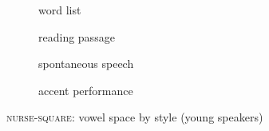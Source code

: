 \begin{figure}[b]
	
	\begin{subfigure}{.49\textwidth}
		
			\resizebox{\linewidth}{!}{} 
		\caption{word list}
		\label{fig.nurse.space.young.list}
	\end{subfigure}
	\begin{subfigure}{.49\textwidth}
		
			\resizebox{\linewidth}{!}{} 
		\caption{reading passage}
		\label{fig.nurse.space.young.read}
	\end{subfigure}
	
	\begin{subfigure}{.49\textwidth}
		
			\resizebox{\linewidth}{!}{} 
		\caption{spontaneous speech}
		\label{fig.nurse.space.young.free}
	\end{subfigure}
	\begin{subfigure}{.49\textwidth}
		
			\resizebox{\linewidth}{!}{} 
		\caption{accent performance}
		\label{fig.nurse.space.young.imit}
	\end{subfigure}
	
	\caption{\textsc{nurse}-\textsc{square}: vowel space by style (young speakers)}
	\label{fig.nurse.space.young}
\end{figure}

